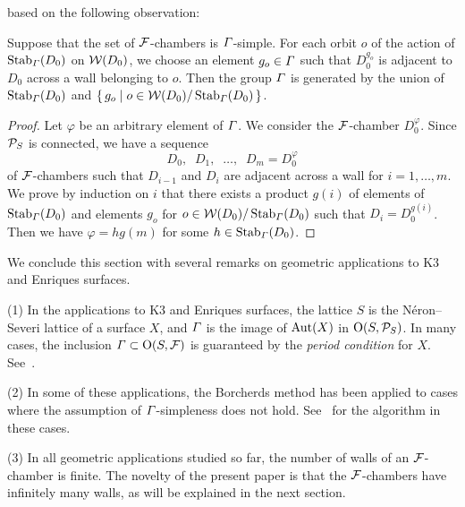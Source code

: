 \documentclass{amsart} %
\begin{document}
based on the following observation:
%
\begin{proposition}\label{prop:observation}
Suppose that the set of $\mathord{\mathcal{F}}$-chambers is $\varGamma$-simple.
For each orbit $o$ of the action of $\operatorname{Stab}_{\varGamma}(D_0)$ on $\mathord{\mathcal{W}}(D_0)$,
we choose an element $g_o\in \varGamma$ such that
$D_0^{g_o}$ is adjacent to $D_0$ across a wall
belonging to $o$.
Then the group $\varGamma$ is generated by the union of 
$\operatorname{Stab}_{\varGamma}(D_0)$ and $\{\,{g_o}\mid {o\in \mathord{\mathcal{W}}(D_0)/\operatorname{Stab}_{\varGamma}(D_0)} \,\}$.
\end{proposition}
%
\begin{proof}
Let $\varphi$ be an arbitrary element of $\varGamma$.
We consider the $\mathord{\mathcal{F}}$-chamber $D_0^{\varphi}$.
Since $\mathord{\mathcal{P}}_S$ is connected, 
we have a sequence
\[
D_0, \;\; D_1, \;\; \dots, \;\; D_m=D_0^{\varphi}
\]
of $\mathord{\mathcal{F}}$-chambers such that $D_{i-1}$ and $D_i$ are 
adjacent across a wall for $i=1, \dots, m$.
We prove by induction on $i$ that there exists 
a product $g(i)$ of elements of $\operatorname{Stab}_{\varGamma}(D_0)$ and 
 elements $g_o$ for $o\in \mathord{\mathcal{W}}(D_0)/\operatorname{Stab}_{\varGamma}(D_0)$
such that $D_i=D_0^{g(i)}$.
Then we have $\varphi=h g(m) $ for some $h\in \operatorname{Stab}_{\varGamma}(D_0)$.
\end{proof}
%
We conclude this section with several remarks on geometric applications
to K3 and Enriques surfaces. 
%
\begin{remark}\label{rem:geom}
(1) 
In the applications to K3 and Enriques surfaces, 
the lattice $S$ is the N\'eron--Severi lattice of a surface $X$,
and $\varGamma$ is the image of $\operatorname{Aut}(X)$ in $\mathord{\mathrm{O}}(S,\mathord{\mathcal{P}}_S)$.
In many cases, the inclusion
$\varGamma \subset \mathord{\mathrm{O}}(S,\mathord{\mathcal{F}})$
is guaranteed by the \emph{period condition} for $X$.
See~\cite[Section~5.2]{MR4759604}.
\par
(2) 
In some of these applications, 
the Borcherds method has been applied to cases where 
the assumption of $\varGamma$-simpleness does not hold.
See~\cite[Section 5.1]{MR4759604} for the algorithm
in these cases.
%
\par
(3) 
In all geometric applications studied so far,
the number of walls of an $\mathord{\mathcal{F}}$-chamber is finite.
The novelty of the present paper is that
the $\mathord{\mathcal{F}}$-chambers have infinitely many walls,
as will be explained in the next section.
\end{remark}
%
%
\end{document}
